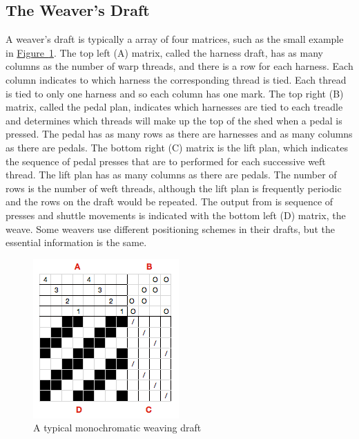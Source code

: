 \documentclass[10pt,]{article}
\theoremstyle{plain}
\begin{document}
\subsection[The Weaver's Draft]{The Weaver's Draft}\label{ss-weaving-draft}
A weaver's draft is typically a array of four matrices, such as the small example in \hyperref[fig-draft]{Figure~\ref{fig-draft}}. The top left (A) matrix, called the harness draft, has as many columns as the number of warp threads, and there is a row for each harness.  Each column indicates to which harness the corresponding thread is tied. Each thread is tied to only one harness and so each column has one mark.  The top right (B) matrix, called the pedal plan, indicates which harnesses are tied to each treadle and determines which threads will make up the top of the shed when a pedal is pressed. The pedal has as many rows as there are harnesses and as many columns as there are pedals.  The bottom right (C) matrix is the lift plan, which indicates the sequence of pedal presses that are to performed for each successive weft thread. The lift plan has as many columns as there are pedals.  The number of rows is the number of weft threads, although the lift plan is frequently periodic and the rows on the draft would be repeated. The output from is sequence of presses and shuttle movements is indicated with the bottom left (D) matrix, the weave.  Some weavers use different  positioning schemes in their drafts, but the essential information is the same.  %
\leavevmode%
\begin{figure}
\centering
\includegraphics[width=0.8\linewidth]{images/fig-draft.png}
\caption{A typical monochromatic weaving draft
                \label{fig-draft}}
\end{figure}
\typeout{************************************************}
\typeout{************************************************}
\end{document}
